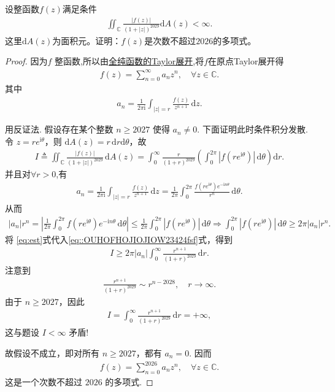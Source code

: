 \documentclass[../../main.tex]{subfiles}%
\begin{document}
\begin{example}
设整函数$f(z)$满足条件
\begin{align*}
\iint_{\mathbb{C}} \frac{|f(z)|}{(1+|z|)^{2029}} \mathrm{d}A(z) < \infty.
\end{align*}
这里$\mathrm{d}A(z)$为面积元。证明：$f(z)$是次数不超过$2026$的多项式。
\end{example}
\begin{proof}

因为\(f\) 整函数,所以由\hyperref[theorem:全纯函数的Taylor展开]{全纯函数的Taylor展开},将$f$在原点Taylor展开得
\begin{align*}
f(z)=\sum\limits_{n=0}^\infty a_n z^n,\quad \forall z\in \mathbb{C}.
\end{align*}
其中
\begin{align*}
a_n=\frac{1}{2\pi \mathrm{i}}\int_{|z|=r}{\frac{f(z)}{z^{n+1}}\,\mathrm{d}z}.
\end{align*}

用反证法. 假设存在某个整数 \(n\geqslant 2027\) 使得 \(a_n\neq 0\). 下面证明此时条件积分发散.
令 \(z=re^{\mathrm{i}\theta}\)，则 \(\mathrm{d}A(z)=r\,\mathrm{d}r\mathrm{d}\theta\)，故
\begin{align}\label{eq::OUHOFHOJIOJIOW23424fsf}
I\triangleq \iint_{\mathbb C} \frac{|f(z)|}{(1+|z|)^{2029}}\,\mathrm{d}A(z)
=\int_0^\infty \frac{r}{(1+r)^{2029}}
\left(\int_0^{2\pi} |f(re^{\mathrm{i}\theta})|\,\mathrm{d}\theta\right) \mathrm{d}r.
\end{align}
并且对\(\forall r>0\),有
\begin{align*}
a_n=\frac{1}{2\pi \mathrm{i}}\int_{|z|=r}{\frac{f(z)}{z^{n+1}}\,\mathrm{d}z}=\frac{1}{2\pi}\int_0^{2\pi}{\frac{f(re^{\mathrm{i}\theta})e^{-\mathrm{i}n\theta}}{r^n}\,\mathrm{d}\theta}.
\end{align*}
从而
\begin{align}
|a_n| r^n
=\left|\frac{1}{2\pi}\int_0^{2\pi} f(re^{\mathrm{i}\theta}) e^{-\mathrm{i}n\theta}\,\mathrm{d}\theta\right|
\leqslant \frac{1}{2\pi}\int_0^{2\pi} |f(re^{\mathrm{i}\theta})|\,\mathrm{d}\theta\Longrightarrow 
\int_0^{2\pi} |f(re^{\mathrm{i}\theta})|\,\mathrm{d}\theta \geqslant 2\pi |a_n| r^n. \label{eq:est}
\end{align}
将 \eqref{eq:est}式代入\eqref{eq::OUHOFHOJIOJIOW23424fsf}式，得到
\begin{align*}
I \geqslant 2\pi |a_n| \int_0^\infty \frac{r^{n+1}}{(1+r)^{2029}}\,\mathrm{d}r.
\end{align*}
注意到
\begin{align*}
\frac{r^{n+1}}{(1+r)^{2029}} \sim r^{n-2028},\quad r\to\infty.
\end{align*}
由于 \(n\geqslant 2027\)，因此
\begin{align*}
I=\int_0^\infty \frac{r^{n+1}}{(1+r)^{2029}}\,\mathrm{d}r=+\infty,
\end{align*}
这与题设 \(I<\infty\) 矛盾!

故假设不成立，即对所有 \(n\geqslant 2027\)，都有 \(a_n=0\). 因而
\begin{align*}
f(z)=\sum_{n=0}^{2026} a_n z^n,\quad \forall z\in \mathbb{C}.
\end{align*}
这是一个次数不超过 \(2026\) 的多项式.
\end{proof}
\end{document}
